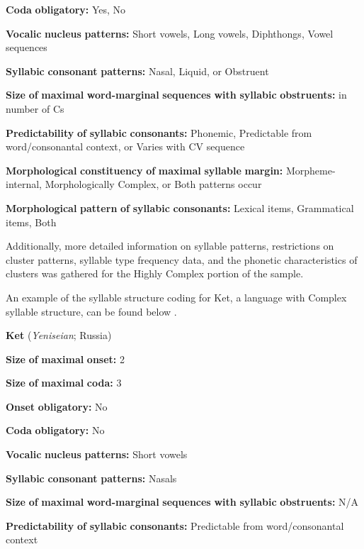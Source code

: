 \textbf{Coda} \textbf{obligatory:} Yes, No

\textbf{Vocalic} \textbf{nucleus} \textbf{patterns:} Short vowels, Long vowels, Diphthongs, Vowel sequences

\textbf{Syllabic} \textbf{consonant} \textbf{patterns:} Nasal, Liquid, or Obstruent

\textbf{Size} \textbf{of} \textbf{maximal} \textbf{word-marginal} \textbf{sequences} \textbf{with} \textbf{syllabic} \textbf{obstruents:} in number of Cs

\textbf{Predictability} \textbf{of} \textbf{syllabic} \textbf{consonants:} Phonemic, Predictable from word/consonantal context, or Varies with CV sequence

\textbf{Morphological} \textbf{constituency} \textbf{of} \textbf{maximal} \textbf{syllable} \textbf{margin:} Morpheme-internal, Morphologically Complex, or Both patterns occur

\textbf{Morphological} \textbf{pattern} \textbf{of} \textbf{syllabic} \textbf{consonants:} Lexical items, Grammatical items, Both

  Additionally, more detailed information on syllable patterns, restrictions on cluster patterns, syllable type frequency data, and the phonetic characteristics of clusters was gathered for the Highly Complex portion of the sample.

  An example of the syllable structure coding for Ket, a language with Complex syllable structure, can be found below .

\ea\label{ex:(3.11)}
  \textbf{Ket} (\textit{Yeniseian}; Russia)

\textbf{Size} \textbf{of} \textbf{maximal} \textbf{onset:} 2

\textbf{Size} \textbf{of} \textbf{maximal} \textbf{coda:} 3

\textbf{Onset} \textbf{obligatory:} No

\textbf{Coda} \textbf{obligatory:} No

\textbf{Vocalic} \textbf{nucleus} \textbf{patterns:} Short vowels

\textbf{Syllabic} \textbf{consonant} \textbf{patterns:} Nasals

\textbf{Size} \textbf{of} \textbf{maximal} \textbf{word-marginal} \textbf{sequences} \textbf{with} \textbf{syllabic} \textbf{obstruents:} N/A

\textbf{Predictability} \textbf{of} \textbf{syllabic} \textbf{consonants:} Predictable from word/consonantal context

